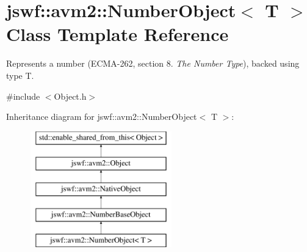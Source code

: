\hypertarget{classjswf_1_1avm2_1_1_number_object}{\section{jswf\+:\+:avm2\+:\+:Number\+Object$<$ T $>$ Class Template Reference}
\label{classjswf_1_1avm2_1_1_number_object}
}


Represents a number (E\+C\+M\+A-\/262, section 8. {\itshape The Number Type}), backed using type {\ttfamily T}.  




{\ttfamily \#include $<$Object.\+h$>$}

Inheritance diagram for jswf\+:\+:avm2\+:\+:Number\+Object$<$ T $>$\+:\begin{figure}[H]
\begin{center}
\leavevmode
\includegraphics[height=5.000000cm]{classjswf_1_1avm2_1_1_number_object}
\end{center}
\end{figure}
